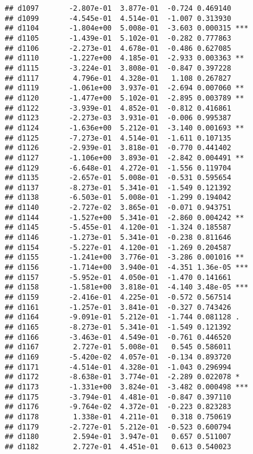 \documentclass[
]{article}
\begin{document}
\begin{verbatim}
## d1097       -2.807e-01  3.877e-01  -0.724 0.469140    
## d1099       -4.545e-01  4.514e-01  -1.007 0.313930    
## d1104       -1.804e+00  5.008e-01  -3.603 0.000315 ***
## d1105       -1.439e-01  5.102e-01  -0.282 0.777863    
## d1106       -2.273e-01  4.678e-01  -0.486 0.627085    
## d1110       -1.227e+00  4.185e-01  -2.933 0.003363 ** 
## d1115       -3.224e-01  3.808e-01  -0.847 0.397228    
## d1117        4.796e-01  4.328e-01   1.108 0.267827    
## d1119       -1.061e+00  3.937e-01  -2.694 0.007060 ** 
## d1120       -1.477e+00  5.102e-01  -2.895 0.003789 ** 
## d1122       -3.939e-01  4.852e-01  -0.812 0.416861    
## d1123       -2.273e-03  3.931e-01  -0.006 0.995387    
## d1124       -1.636e+00  5.212e-01  -3.140 0.001693 ** 
## d1125       -7.273e-01  4.514e-01  -1.611 0.107135    
## d1126       -2.939e-01  3.818e-01  -0.770 0.441402    
## d1127       -1.106e+00  3.893e-01  -2.842 0.004491 ** 
## d1129       -6.648e-01  4.272e-01  -1.556 0.119704    
## d1135       -2.657e-01  5.008e-01  -0.531 0.595654    
## d1137       -8.273e-01  5.341e-01  -1.549 0.121392    
## d1138       -6.503e-01  5.008e-01  -1.299 0.194042    
## d1140       -2.727e-02  3.865e-01  -0.071 0.943751    
## d1144       -1.527e+00  5.341e-01  -2.860 0.004242 ** 
## d1145       -5.455e-01  4.120e-01  -1.324 0.185587    
## d1146       -1.273e-01  5.341e-01  -0.238 0.811646    
## d1154       -5.227e-01  4.120e-01  -1.269 0.204587    
## d1155       -1.241e+00  3.776e-01  -3.286 0.001016 ** 
## d1156       -1.714e+00  3.940e-01  -4.351 1.36e-05 ***
## d1157       -5.952e-01  4.050e-01  -1.470 0.141661    
## d1158       -1.581e+00  3.818e-01  -4.140 3.48e-05 ***
## d1159       -2.416e-01  4.225e-01  -0.572 0.567514    
## d1161       -1.257e-01  3.841e-01  -0.327 0.743426    
## d1164       -9.091e-01  5.212e-01  -1.744 0.081128 .  
## d1165       -8.273e-01  5.341e-01  -1.549 0.121392    
## d1166       -3.463e-01  4.549e-01  -0.761 0.446520    
## d1167        2.727e-01  5.008e-01   0.545 0.586011    
## d1169       -5.420e-02  4.057e-01  -0.134 0.893720    
## d1171       -4.514e-01  4.328e-01  -1.043 0.296994    
## d1172       -8.638e-01  3.774e-01  -2.289 0.022078 *  
## d1173       -1.331e+00  3.824e-01  -3.482 0.000498 ***
## d1175       -3.794e-01  4.481e-01  -0.847 0.397110    
## d1176       -9.764e-02  4.372e-01  -0.223 0.823283    
## d1178        1.338e-01  4.211e-01   0.318 0.750619    
## d1179       -2.727e-01  5.212e-01  -0.523 0.600794    
## d1180        2.594e-01  3.947e-01   0.657 0.511007    
## d1182        2.727e-01  4.451e-01   0.613 0.540023    

\end{verbatim}
\end{document}
